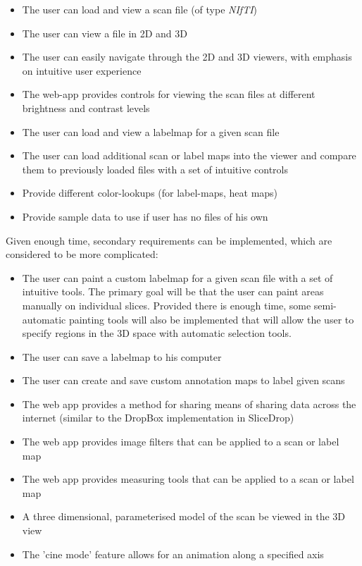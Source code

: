 \documentclass[a4paper,11pt,twoside]{article}
\begin{document}
\begin{itemize}
\item The user can load and view a scan file (of type \textit{NIfTI})
\item The user can view a file in 2D and 3D
\item The user can easily navigate through the 2D and 3D viewers, with emphasis on intuitive user experience
\item The web-app provides controls for viewing the scan files at different brightness and contrast levels
\item The user can load and view a labelmap for a given scan file
\item The user can load additional scan or label maps into the viewer and compare them to previously loaded files with a set of intuitive controls
\item Provide different color-lookups (for label-maps, heat maps)
\item Provide sample data to use if user has no files of his own
\end{itemize}

Given enough time, secondary requirements can be implemented, which are considered to be more complicated:

\begin{itemize}
\item The user can paint a custom labelmap for a given scan file with a set of intuitive tools. The primary goal will be that the user can paint areas manually on individual slices. Provided there is enough time, some semi-automatic painting tools will also be implemented that will allow the user to specify regions in the 3D space with automatic selection tools. 
\item The user can save a labelmap to his computer
\item The user can create and save custom annotation maps to label given scans
\item The web app provides a method for sharing  means of sharing data across the internet (similar to the DropBox implementation in SliceDrop)
\item The web app provides image filters that can be applied to a scan or label map
\item The web app provides measuring tools that can be applied to a scan or label map
\item A three dimensional, parameterised model of the scan be viewed in the 3D view
\item The 'cine mode' feature allows for an animation along a specified axis
\end{itemize}
\end{document}
